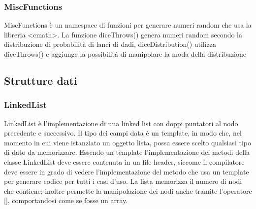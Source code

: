 \documentclass[12pt]{article}
\begin{document}
\subsubsection{MiscFunctions}
    MiscFunctions è un namespace di funzioni per generare numeri random che usa la libreria <cmath>.
    La funzione diceThrows() genera numeri random secondo la distribuzione di probabilità di lanci di dadi, diceDistribution() utilizza diceThrows() e aggiunge la possibilità di manipolare la moda della distribuzione

\subsection{Strutture dati}

\subsubsection{LinkedList}
    LinkedList è l'implementazione di una linked list con doppi puntatori al nodo precedente e successivo.
    Il tipo dei campi data è un template, in modo che, nel momento in cui viene istanziato un oggetto lista, possa essere scelto qualsiasi tipo di dato da memorizzare. 
    Essendo un template l'implementazione dei metodi della classe LinkedList deve essere contenuta in un file header, siccome il compilatore deve essere in grado di vedere l'implementazione del metodo che usa un template per generare codice per tutti i casi d'uso.
    La lista memorizza il numero di nodi che contiene; inoltre permette la manipolazione dei nodi anche tramite l'operatore [], comportandosi come se fosse un array.


\pagebreak
\end{document}
